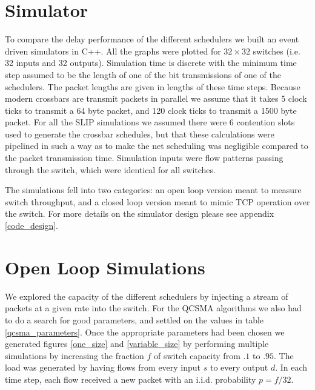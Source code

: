 \documentclass[11pt]{article}%
\begin{document}
\section{Simulator}

To compare the delay performance of the different schedulers we built an event driven simulators in C++.  All the graphs were plotted for $32 \times 32$ switches (i.e. 32 inputs and 32 outputs).  Simulation time is discrete with the minimum time step assumed to be the length of one of the bit transmissions of one of the schedulers.   The packet lengths are given in lengths of these time steps.  Because modern crossbars are transmit packets in parallel we assume that it takes 5 clock ticks to transmit a 64 byte packet, and 120 clock ticks to transmit a 1500 byte packet.  For all the SLIP simulations we assumed there were $6$ contention slots used to generate the crossbar schedules, but that these calculations were pipelined in such a way as to make the net scheduling was negligible compared to the packet transmission time.  Simulation inputs were flow patterns passing through the switch, which were identical for all switches. %

 The simulations fell into two categories: an open loop version meant to measure switch throughput, and a closed loop version meant to mimic TCP operation over the switch.  For more details on the simulator design please see appendix \ref{code_design}.%
 
\section{Open Loop Simulations} \label{open}

We explored the capacity of the different schedulers by injecting a stream of packets at a given rate into the switch.  For the QCSMA algorithms we also had to do a search for good parameters, and settled on the values in table \ref{qcsma_parameters}.  Once the appropriate parameters had been chosen we generated figures \ref{one_size} and \ref{variable_size} by performing multiple simulations by increasing the fraction $f$ of switch capacity from $.1$ to $.95$.  The load was generated by having flows from every input $s$ to every output $d$.  In each time step, each flow received a new packet with an i.i.d. probability $p=f/32$.
\end{document}
